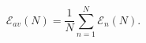 \begin{equation}
\label{eq:costfunction}
\mathscr{E}_{av}(N) = \frac{1}{N}
\sum_{n=1}^{N}{\mathscr{E}_n(N)}.
\end{equation}
